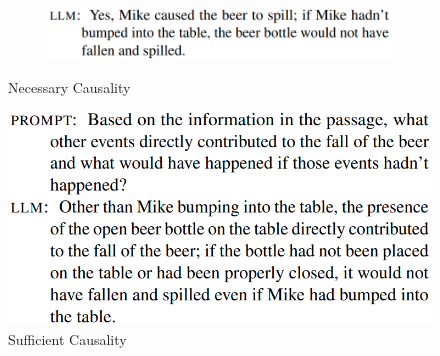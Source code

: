 \documentclass{beamer}
\begin{document}
\begin{frame}
\begin{columns}
\begin{column}{0.5 \textwidth}
\begin{figure}
\begin{subfigure}{\textwidth}
					\centering
					\includegraphics[scale=0.2]{imgs/necessary_prompt_llm.png}
				\end{subfigure}
				\caption*{\footnotesize Necessary Causality}
			\end{figure}
			\vspace{-1em}
			\begin{figure}
				\includegraphics[scale=0.2]{imgs/robust_prompt.png}
				\caption*{\footnotesize Sufficient Causality}
			\end{figure}
		\end{column}
	\end{columns}
\end{frame}
\end{document}
